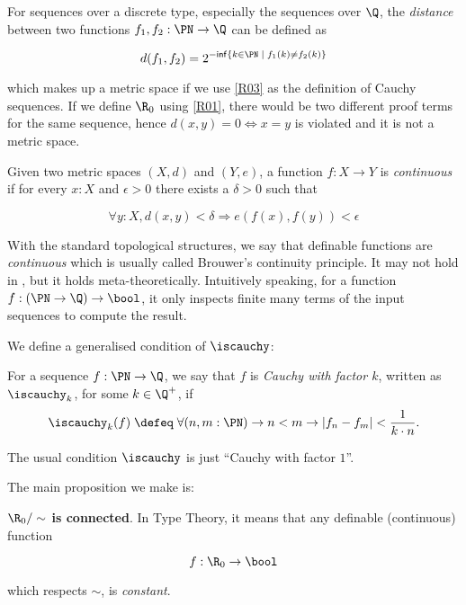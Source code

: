 For sequences over a discrete type, especially the sequences over $\Q$, the \emph{distance} between two functions $f_1,f_2 : \PN \to \Q$ can be defined as

\begin{equation}
d(f_1,f_2) = 2^{-\mathsf{inf}\{k \in \PN \; | \; f_1(k) \not= f_2(k)\}}
\end{equation}

which makes up a metric space if we use \ref{R03} as the definition  of Cauchy sequences. If we define $\R_0$ using \ref{R01}, there would be two different proof terms for the same sequence, hence $d (x , y) = 0 \iff x = y$ is violated and it is not a metric space.

Given two metric spaces $(X, d)$ and $(Y, e)$, a function $f : X \to Y$ is \emph{continuous} if for every $x : X$ and $\epsilon > 0$ there exists a $\delta > 0$ such that

$$\forall y : X, d(x,y) < \delta \Rightarrow e(f(x),f(y)) < \epsilon$$

With the standard topological structures, we say that definable functions are \emph{continuous} which is usually called Brouwer's continuity principle. It may not hold in \itt, but it holds meta-theoretically. 
Intuitively speaking, for a function $f : (\PN \to \Q) \to \bool$, it only inspects finite many terms of the input sequences to compute the result.


We define a generalised condition of $\iscauchy$:

\begin{definition}
 For a sequence $f : \PN \to \Q$, we say that $f$ is \emph{Cauchy with
   factor $k$}, written as $\iscauchy_k$, for some $k \in \Q^+$, if
 \begin{equation}
  \iscauchy_k(f) \; \defeq \; \forall (n,m : \PN) \to n < m \to |f_n - f_m| < \frac {1} {k \cdot n}. \label{eq:cauchy-aux}
 \end{equation}
\end{definition}

The usual condition $\iscauchy$ is just ``Cauchy with factor $1$''.



The main proposition we make is:

\begin{proposition}\label{realconnected} %
 \textbf{$\R_0 / \sim$ is connected}. 
In Type Theory, it means that any definable (continuous) function 

$$f : \R_0 \to \bool$$

 which respects $\sim$, is \emph{constant}.
\end{proposition}


